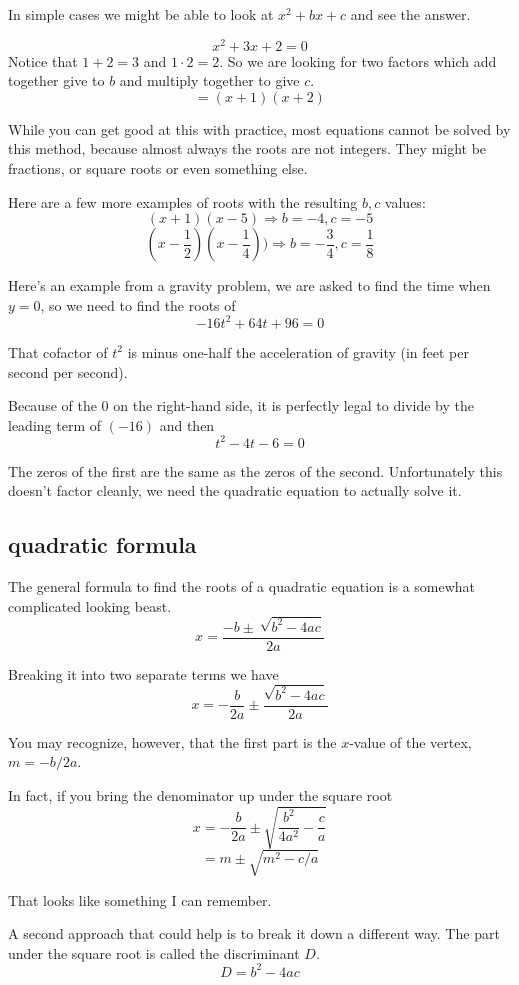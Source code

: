 \documentclass[11pt, oneside]{article}
\begin{document}
In simple cases we might be able to look at $x^2 + bx + c$ and see the answer.

\[ x^2 + 3x + 2 = 0 \]
Notice that $1 + 2 = 3$ and $1 \cdot 2 = 2$.  So we are looking for two factors which add together give to $b$ and multiply together to give $c$.
\[ = (x + 1)(x + 2) \]

While you can get good at this with practice, most equations cannot be solved by this method, because almost always the roots are not integers.  They might be fractions, or square roots or even something else.

Here are a few more examples of roots with the resulting $b,c$ values:
\[ (x + 1)(x - 5) \Rightarrow b = -4, c = -5 \]
\[ (x - \frac{1}{2})(x - \frac{1}{4})) \Rightarrow b = - \frac{3}{4}, c = \frac{1}{8} \]

Here's an example from a gravity problem, we are asked to find the time when $y = 0$, so we need to find the roots of
\[ -16t^2 + 64t + 96 = 0 \]

That cofactor of $t^2$ is minus one-half the acceleration of gravity (in feet per second per second).

Because of the $0$ on the right-hand side, it is perfectly legal to divide by the leading term of $(-16)$ and then
\[ t^2 - 4t - 6 = 0 \]

The zeros of the first are the same as the zeros of the second.  Unfortunately this doesn't factor cleanly, we need the quadratic equation to actually solve it.

\subsection*{quadratic formula}

The general formula to find the roots of a quadratic equation is a somewhat complicated looking beast.
\[ x = \frac{-b \pm \ \sqrt{b^2 - 4ac}}{2a} \]

Breaking it into two separate terms we have
\[ x = - \frac{b}{2a} \pm \frac{\sqrt{b^2 - 4ac}}{2a} \]

You may recognize, however, that the first part is the $x$-value of the vertex, $m = -b/2a$.

In fact, if you bring the denominator up under the square root
\[ x =  - \frac{b}{2a} \pm \sqrt{\frac{b^2}{4a^2} - \frac{c}{a}} \]
\[ = m \pm \sqrt{m^2 - c/a} \]

That looks like something I can remember.

A second approach that could help is to break it down a different way.  The part under the square root is called the discriminant $D$.
\[ D = b^2 - 4ac \]
\end{document}
